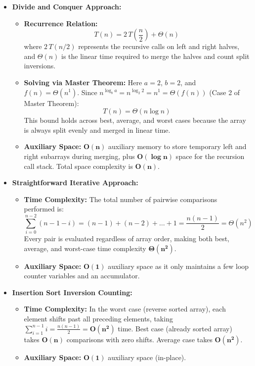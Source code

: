 \documentclass[12pt]{article}
\begin{document}
\begin{itemize}
    \item \textbf{Divide and Conquer Approach:}
    \begin{itemize}
        \item \textbf{Recurrence Relation:}
        \[
        T(n) = 2\,T\left(\frac{n}{2}\right) + \Theta(n)
        \]
        where $2\,T(n/2)$ represents the recursive calls on left and right halves, and $\Theta(n)$ is the linear time required to merge the halves and count split inversions.
        \item \textbf{Solving via Master Theorem:} Here $a = 2$, $b = 2$, and $f(n) = \Theta(n^1)$. Since $n^{\log_b a} = n^{\log_2 2} = n^1 = \Theta(f(n))$ (Case 2 of Master Theorem):
        \[
        T(n) = \Theta(n \log n)
        \]
        This bound holds across best, average, and worst cases because the array is always split evenly and merged in linear time.
        \item \textbf{Auxiliary Space:} $\mathbf{O(n)}$ auxiliary memory to store temporary left and right subarrays during merging, plus $\mathbf{O(\log n)}$ space for the recursion call stack. Total space complexity is $\mathbf{O(n)}$.
    \end{itemize}

    \item \textbf{Straightforward Iterative Approach:}
    \begin{itemize}
        \item \textbf{Time Complexity:} The total number of pairwise comparisons performed is:
        \[
        \sum_{i=0}^{n-2} (n - 1 - i) = (n - 1) + (n - 2) + \dots + 1 = \frac{n(n - 1)}{2} = \Theta(n^2)
        \]
        Every pair is evaluated regardless of array order, making both best, average, and worst-case time complexity $\mathbf{\Theta(n^2)}$.
        \item \textbf{Auxiliary Space:} $\mathbf{O(1)}$ auxiliary space as it only maintains a few loop counter variables and an accumulator.
    \end{itemize}

    \item \textbf{Insertion Sort Inversion Counting:}
    \begin{itemize}
        \item \textbf{Time Complexity:} In the worst case (reverse sorted array), each element shifts past all preceding elements, taking $\sum_{i=1}^{n-1} i = \frac{n(n-1)}{2} = \mathbf{O(n^2)}$ time. Best case (already sorted array) takes $\mathbf{O(n)}$ comparisons with zero shifts. Average case takes $\mathbf{O(n^2)}$.
        \item \textbf{Auxiliary Space:} $\mathbf{O(1)}$ auxiliary space (in-place).
    \end{itemize}


\end{itemize}
\end{document}
